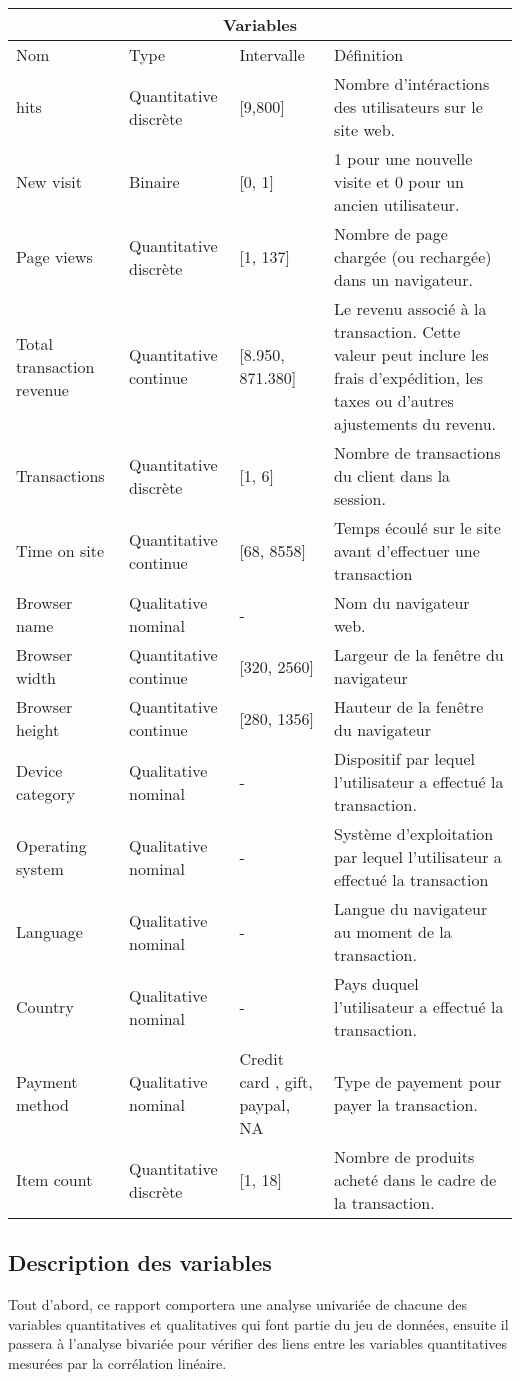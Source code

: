 \begin{center} 
\begin{longtable}{ |p{3cm}||p{3cm}|p{2cm}|p{5cm}| } 
\hline 
\multicolumn{4}{|c|}{Variables} \\ 
\hline 
Nom & Type &Intervalle&Définition\\ 
\hline 
hits & Quantitative discrète &[9,800]&Nombre d’intéractions des utilisateurs sur le site web.\\ New visit & Binaire & [0, 1] & 1 pour une nouvelle visite et 0 pour un ancien utilisateur. \\ Page views& Quantitative discrète & [1, 137] & Nombre de page chargée (ou rechargée) dans un  navigateur.\\
Total transaction revenue & Quantitative continue &[8.950, 871.380]& Le revenu associé à la  transaction. Cette valeur peut inclure les frais d'expédition, les taxes ou d'autres ajustements du  revenu.\\ 
Transactions &Quantitative discrète & [1, 6] & Nombre de transactions du client dans la session.\\ Time on site& Quantitative continue & [68, 8558]& Temps écoulé sur le site avant d'effectuer une  transaction \\ 
Browser name& Qualitative nominal & - & Nom du navigateur web.\\ 
Browser width& Quantitative continue & [320, 2560]& Largeur de la fenêtre du navigateur \\ Browser height& Quantitative continue & [280, 1356]& Hauteur de la fenêtre du navigateur\\ Device category& Qualitative nominal & -&Dispositif par lequel l'utilisateur a effectué la  transaction.\\ 
Operating system& Qualitative nominal & -&Système d'exploitation par lequel l'utilisateur a effectué  la transaction\\ 
Language& Qualitative nominal & -& Langue du navigateur au moment de la transaction.\\ Country& Qualitative nominal & -& Pays duquel l'utilisateur a effectué la transaction.\\ Payment method& Qualitative nominal &Credit card , gift, paypal, NA & Type de payement pour  payer la transaction.\\ 
Item count& Quantitative discrète & [1, 18]& Nombre de produits acheté dans le cadre de la  transaction. \\ 
\hline 
\end{longtable} 
\end{center}  


\subsection{Description des variables}
Tout d'abord, ce rapport comportera une analyse univariée de chacune des variables quantitatives  et qualitatives qui font partie du jeu de données, ensuite il passera à l'analyse bivariée pour vérifier  des liens entre les variables quantitatives mesurées par la corrélation linéaire. 



